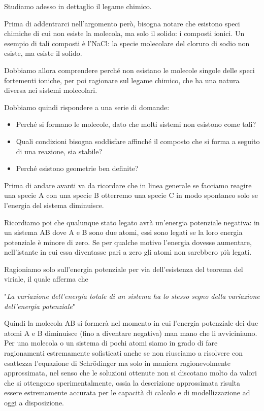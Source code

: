 Studiamo adesso in dettaglio il legame chimico.

Prima di addentrarci nell'argomento però, bisogna notare che esistono speci chimiche di cui non esiste la molecola, ma solo il solido: i composti ionici. Un esempio di tali composti è l'NaCl: la specie molecolare del cloruro di sodio non esiste, ma esiste il solido.

Dobbiamo allora comprendere perché non esistano le molecole singole delle speci fortementi ioniche, per poi ragionare sul legame chimico, che ha una natura diversa nei sistemi molecolari.

Dobbiamo quindi rispondere a una serie di domande:
\begin{itemize}
    \item Perché si formano le molecole, dato che molti sistemi non esistono come tali?
    \item Quali condizioni bisogna soddisfare affinché il composto che si forma a seguito di una reazione, sia stabile?
    \item Perché esistono geometrie ben definite?
\end{itemize}
Prima di andare avanti va da ricordare che in linea generale se facciamo reagire una specie A con una specie B otterremo una specie C in modo spontaneo solo se l'energia del sistema diminuisce. 

Ricordiamo poi che qualunque stato legato avrà un'energia potenziale negativa: in un sistema AB dove A e B sono due atomi, essi sono legati se la loro energia potenziale è minore di zero. Se per qualche motivo l'energia dovesse aumentare, nell'istante in cui essa diventasse pari a zero gli atomi non sarebbero più legati.

Ragioniamo solo sull'energia potenziale per via dell'esistenza del teorema del viriale, il quale afferma che

"\textit{La variazione dell'energia totale di un sistema ha lo stesso segno della variazione dell'energia potenziale}"

Quindi la molecola AB si formerà nel momento in cui l'energia potenziale dei due atomi A e B diminuisce (fino a diventare negativa) man mano che li avviciniamo.\\

Per una molecola o un sistema di pochi atomi siamo in grado di fare ragionamenti estremamente sofisticati anche se non riusciamo a risolvere con esattezza l'equazione di Schrödinger ma solo in maniera ragionevolmente approssimata, nel senso che le soluzioni ottenute non si discotano molto da valori che si ottengono sperimentalmente, ossia la descrizione approssimata risulta essere estremamente accurata per le capacità di calcolo e di modellizzazione ad oggi a disposizione.

